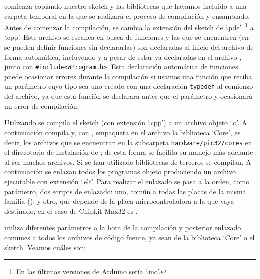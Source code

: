  comienza copiando nuestro sketch y las bibliotecas que hayamos incluido a una carpeta temporal en la que se realizará el proceso de compilación y ensamblado. Antes de comenzar la compilación, se cambia la extensión del sketch de `.pde'~\footnote{En las últimas versiones de Arduino sería `.ino'.} a `.cpp'. Este archivo se escanea en busca de funciones y las que se encuentren (en  se pueden definir funciones sin declararlas) son declaradas al inicio del archivo de forma automática, incluyendo  y  a pesar de estar ya declaradas en el archivo , junto con \verb|#include<WProgram.h>|. Esta declaración automática de funciones puede ocasionar errores durante la compilación si usamos una función que reciba un parámetro cuyo tipo sea uno creado con una declaración \verb|typedef| al comienzo del archivo, ya que esta función se declarará antes que el parámetro y ocasionará un error de compilación.

Utilizando  se compila el sketch (con extensión `.cpp') a un archivo objeto `.o'. A continuación compila y, con , empaqueta en el archivo  la biblioteca `Core', es decir, los archivos que se encuentran en la subcarpeta \verb|hardware/pic32/cores| en el direcotorio de instalación de ; de esta forma se facilita su manejo más adelante al ser muchos archivos. Si se han utilizado bibliotecas de terceros se compilan. A continuación se enlazan todos los programas objeto produciendo un archivo ejecutable con extensión `.elf'. Para realizar el enlazado se pasa a la orden, como parámetro, dos scripts de enlazado: uno, común a todas las placas de la misma familia (); y otro, que depende de la placa microcontroladora a la que vaya destinado; en el caso de Chipkit Max32 es .


 utiliza diferentes parámetros a la hora de la compilación y posterior enlazado, comunes a todos los archivos de código fuente, ya sean de la biblioteca `Core' o el sketch. Veamos cuáles son:

